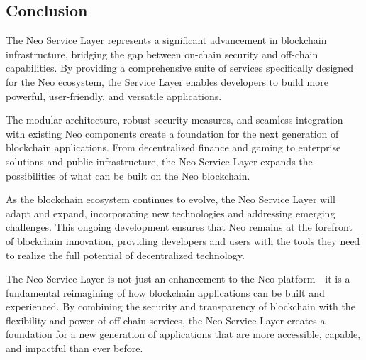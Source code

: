 \documentclass[12pt,a4paper]{article}
\begin{document}
\subsection{Conclusion}
\label{subsec:nsl-conclusion}

The Neo Service Layer represents a significant advancement in blockchain infrastructure, bridging the gap between on-chain security and off-chain capabilities. By providing a comprehensive suite of services specifically designed for the Neo ecosystem, the Service Layer enables developers to build more powerful, user-friendly, and versatile applications.

The modular architecture, robust security measures, and seamless integration with existing Neo components create a foundation for the next generation of blockchain applications. From decentralized finance and gaming to enterprise solutions and public infrastructure, the Neo Service Layer expands the possibilities of what can be built on the Neo blockchain.

As the blockchain ecosystem continues to evolve, the Neo Service Layer will adapt and expand, incorporating new technologies and addressing emerging challenges. This ongoing development ensures that Neo remains at the forefront of blockchain innovation, providing developers and users with the tools they need to realize the full potential of decentralized technology.

The Neo Service Layer is not just an enhancement to the Neo platform—it is a fundamental reimagining of how blockchain applications can be built and experienced. By combining the security and transparency of blockchain with the flexibility and power of off-chain services, the Neo Service Layer creates a foundation for a new generation of applications that are more accessible, capable, and impactful than ever before.
\end{document}
